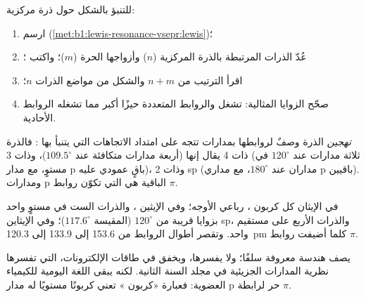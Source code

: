 \begin{method}\label{met:b1:lewis-resonance-vsepr:vsepr}
للتنبؤ بالشكل حول ذرة مركزية:
\begin{enumerate}
  \item ارسم  (\cref{met:b1:lewis-resonance-vsepr:lewis})؛
  \item عُدّ الذرات المرتبطة بالذرة المركزية ($n$) وأزواجها
        الحرة ($m$)؛ واكتب ؛
  \item اقرأ الترتيب من $n + m$ والشكل من
        مواضع الذرات $n$؛
  \item صحّح الزوايا المثالية: تشغل  والروابط المتعددة حيزًا
        أكبر مما تشغله الروابط الأحادية.
\end{enumerate}
\end{method}

\begin{definition}[التهجين]\label{def:b1:lewis-resonance-vsepr:hybridisation}
\emph{تهجين} الذرة وصفٌ
لروابطها بمدارات تتجه على امتداد الاتجاهات
التي يتنبأ بها : فالذرة ذات  4 يقال إنها 
(أربعة مدارات متكافئة عند $109.5^\circ$)، وذات  3 
(ثلاثة مدارات عند $120^\circ$ في مستوٍ، مع مدار p باقٍ
عمودي عليه)، وذات  2 sp (مداران عند $180^\circ$،
مع مداري p باقيين). ومدارات p الباقية هي التي تكوّن روابط $\pi$.
\end{definition}

\begin{example}\label{ex:b1:lewis-resonance-vsepr:carbon}
في الإيثان كل كربون ، رباعي الأوجه؛ وفي الإيثين ، والذرات الست
في مستوٍ واحد بزوايا قريبة من $120^\circ$ (المقيسة 
$117.6^\circ$)؛ وفي الإيثاين sp، والذرات الأربع على مستقيم واحد. وتقصر
أطوال الروابط من 153.6 إلى 133.9 إلى \qty{120.3}{pm} كلما أضيفت روابط $\pi$.
\end{example}

\begin{remark}\label{rem:b1:lewis-resonance-vsepr:hybrid-limit}
يصف  هندسة معروفة سلفًا؛ ولا يفسرها،
ويخفق في طاقات الإلكترونات، التي تفسرها نظرية المدارات الجزيئية
في مجلد السنة الثانية. لكنه يبقى اللغة اليومية
للكيمياء العضوية: فعبارة «كربون » تعني كربونًا مستويًا
له مدار p حر لرابطة $\pi$.
\end{remark}

